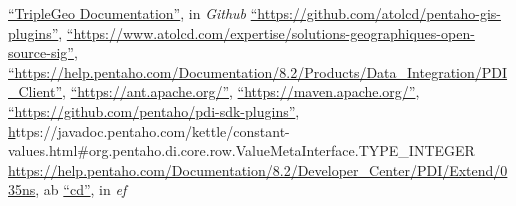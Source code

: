 \begin{thebibliography}{99}
        \href{https://github.com/oeg-upm/geo.linkeddata.es-TripleGeoKettle/wiki}{``TripleGeo Documentation''},
        in \textit{Github}
        \href{https://github.com/atolcd/pentaho-gis-plugins}{``https://github.com/atolcd/pentaho-gis-plugins''},
        \href{https://www.atolcd.com/expertise/solutions-geographiques-open-source-sig}{``https://www.atolcd.com/expertise/solutions-geographiques-open-source-sig''},
        \href{https://help.pentaho.com/Documentation/8.2/Products/Data\_Integration/PDI\_Client}{``https://help.pentaho.com/Documentation/8.2/Products/Data\_Integration/PDI\_Client''},
        \href{https://ant.apache.org/}{``https://ant.apache.org/''},
        \href{https://maven.apache.org/}{``https://maven.apache.org/''},
        \href{https://github.com/pentaho/pdi-sdk-plugins}{``https://github.com/pentaho/pdi-sdk-plugins''},
        \href{https://javadoc.pentaho.com/kettle/constant-values.html#org.pentaho.di.core.row.ValueMetaInterface.TYPE_INTEGER}
        https://javadoc.pentaho.com/kettle/constant-values.html\#org.pentaho.di.core.row.ValueMetaInterface.TYPE\_INTEGER
        \href{https://help.pentaho.com/Documentation/8.2/Developer_Center/PDI/Extend/035}{https://help.pentaho.com/Documentation/8.2/Developer\_Center/PDI/Extend/035ns},
    ab
        \href{}{``cd''},
        in \textit{ef}



\end{thebibliography}
